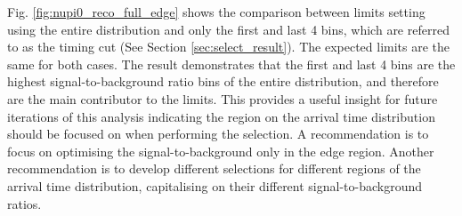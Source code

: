 Fig. \ref{fig:nupi0_reco_full_edge} shows the comparison between limits setting using the entire distribution and only the first and last 4 bins, which are referred to as the timing cut (See Section \ref{sec:select_result}). 
The expected limits are the same for both cases.
The result demonstrates that the first and last 4 bins are the highest signal-to-background ratio bins of the entire distribution, and therefore are the main contributor to the limits.
This provides a useful insight for future iterations of this analysis indicating the region on the arrival time distribution should be focused on when performing the selection.
A recommendation is to focus on optimising the signal-to-background only in the edge region.
Another recommendation is to develop different selections for different regions of the arrival time distribution, capitalising on their different signal-to-background ratios.

